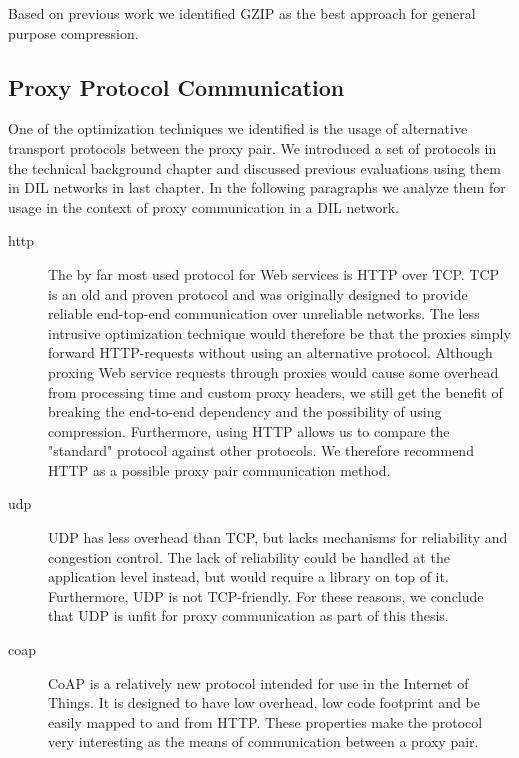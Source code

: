 Based on previous work we identified GZIP as the best approach for general
purpose compression.

\subsection{Proxy Protocol Communication}

One of the optimization techniques we identified is the usage of alternative
transport protocols between the proxy pair. We introduced a set of protocols in
the technical background chapter and discussed previous evaluations using them
in DIL networks in last chapter. In the following paragraphs we analyze them for
usage in the context of proxy communication in a DIL network.

\begin{description}

    \item[\gls{http}] The by far most used protocol for Web services is HTTP
    over TCP. TCP is an old and proven protocol and was originally designed to
    provide reliable end-top-end communication over unreliable networks. The
    less intrusive optimization technique would therefore be that the proxies
    simply forward HTTP-requests without using an alternative protocol.
    Although proxing Web service requests through proxies would cause some overhead from
    processing time and custom proxy headers, we still get the benefit of
    breaking the end-to-end dependency and the possibility of using compression.
    Furthermore, using HTTP allows us to compare the "standard" protocol against
    other protocols. We therefore recommend HTTP as a possible proxy pair
    communication method.

    \item[\gls{udp}] UDP has less overhead than TCP, but lacks mechanisms for
    reliability and congestion control. The lack of reliability could be handled
    at the application level instead, but would require a library on top of it.
    Furthermore, UDP is not TCP-friendly. For these reasons, we conclude that UDP
    is unfit for proxy communication as part of this thesis.

	\item[\gls{coap}] CoAP is a relatively new protocol intended for use in the
	Internet of Things. It is designed to have low overhead, low code footprint
	and be easily mapped to and from HTTP. These properties make the protocol
	very interesting as the means of communication between a proxy pair.


\end{description}
